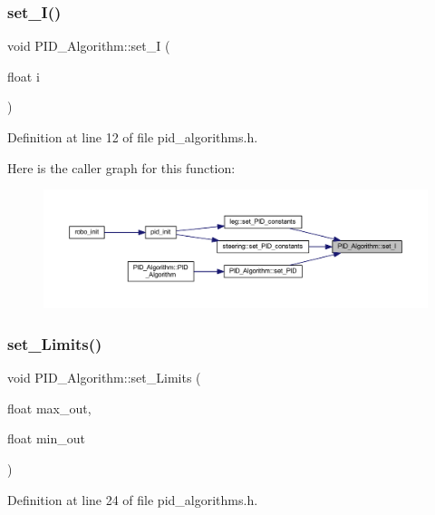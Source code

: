 \subsubsection{\texorpdfstring{set\_I()}{set\_I()}}
{\footnotesize\ttfamily void P\+I\+D\+\_\+\+Algorithm\+::set\+\_\+I (\begin{DoxyParamCaption}\item[{float}]{i }\end{DoxyParamCaption})\hspace{0.3cm}{\ttfamily [inline]}}



Definition at line 12 of file pid\+\_\+algorithms.\+h.

Here is the caller graph for this function\+:
\nopagebreak
\begin{figure}[H]
\begin{center}
\leavevmode
\includegraphics[width=350pt]{class_p_i_d___algorithm_a06fbd1eb698b088e5378a224521a5323_icgraph}
\end{center}
\end{figure}
\mbox{\label{class_p_i_d___algorithm_a100df14fcad2a1bbcb67c53b7d664d8a}} 
\subsubsection{\texorpdfstring{set\_Limits()}{set\_Limits()}}
{\footnotesize\ttfamily void P\+I\+D\+\_\+\+Algorithm\+::set\+\_\+\+Limits (\begin{DoxyParamCaption}\item[{float}]{max\+\_\+out,  }\item[{float}]{min\+\_\+out }\end{DoxyParamCaption})\hspace{0.3cm}{\ttfamily [inline]}}



Definition at line 24 of file pid\+\_\+algorithms.\+h.


